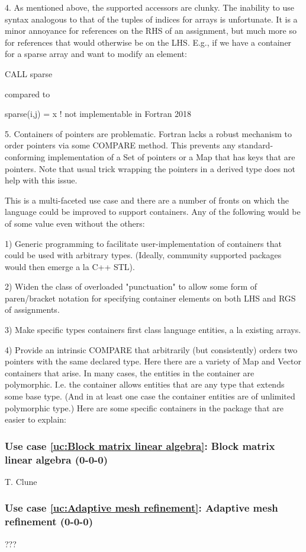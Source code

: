 \documentclass{article}
\newcounter{usecase}
\newcommand{\newusecase}[2]{
\refstepcounter{usecase}\label{uc:#1}
\subsubsection{Use case \ref{uc:#1}: #1 (#2)}}
\begin{document}
4. As mentioned above, the supported accessors are clunky.  The
   inability to use syntax analogous to that of the tuples of indices
   for arrays is unfortunate.  It is a minor annoyance for references
   on the RHS of an assignment, but much more so for references that
   would otherwise be on the LHS.  E.g., if we have a container for a
   sparse array and want to modify an element:

      CALL sparse%

   compared to

      sparse(i,j) = x  ! not implementable in Fortran 2018

5. Containers of pointers are problematic.  Fortran lacks a robust
   mechanism to order pointers via some COMPARE method.  This prevents
   any standard-conforming implementation of a Set of pointers or a
   Map that has keys that are pointers.  Note that usual trick wrapping the
   pointers in a derived type does not help with this issue.


This is a multi-faceted use case and there are a number of fronts on
which the language could be improved to support containers.  Any of
the following would be of some value even without the others:

1) Generic programming to facilitate user-implementation of
   containers that could be used with arbitrary types.  (Ideally,
   community supported packages would then emerge a la C++ STL).

2) Widen the class of overloaded "punctuation" to allow some form of
   paren/bracket notation for specifying container elements on both
   LHS and RGS of assignments.

3) Make specific types containers first class language entities, a la
   existing arrays.

4) Provide an intrinsic COMPARE that arbitrarily (but consistently)
   orders two pointers with the same declared type. Here there are a
   variety of Map and Vector containers that arise.  In many cases,
   the entities in the container are polymorphic.  I.e. the container
   allows entities that are any type that extends some base type.
   (And in at least one case the container entities are of unlimited
   polymorphic type.)  Here are some specific containers in the
   package that are easier to explain:








\newusecase{Block matrix linear algebra}{0-0-0}
T. Clune
\newusecase{Adaptive mesh refinement}{0-0-0}
???
\end{document}
